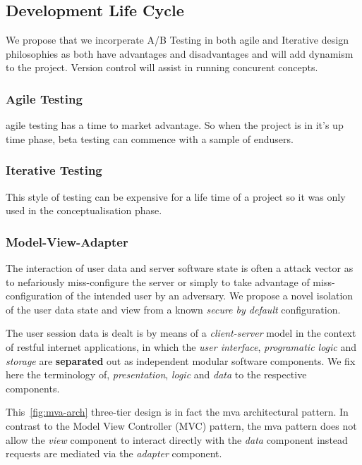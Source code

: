 \documentclass[letterpaper,12pt]{article}
\begin{document}
\subsection{Development Life Cycle}

We propose that we incorperate A/B Testing in both \Gls{agile} and Iterative design philosophies as both have advantages and disadvantages and will add dynamism to the project. Version control will assist in running concurent concepts. 

\subsubsection{Agile Testing}

\Gls{agile} testing has a time to market advantage. So when the project is in it's up time phase, beta testing can commence with a sample of endusers.

\subsubsection{Iterative Testing}

This style of testing can be expensive for a life time of a project so it was only used in the conceptualisation phase.

\subsubsection{Model-View-Adapter}

The interaction of user data and server software state is often a attack vector
as to nefariously miss-configure the server or simply to take advantage of
miss-configuration of the intended user by an adversary. We propose a novel
isolation of the user data state and view from a known \emph{secure by default}
configuration.

The user session data is dealt is by means of a \emph{client-server}
model in the context of \gls{restful} internet applications, in which
the \emph{user interface}, \emph{programatic logic}
and \emph{storage} are \textbf{separated} out as
independent modular software components. We fix here the terminology of,
\emph{presentation}, \emph{logic} and \emph{data} to the respective
components.



This~\cref{fig:mva-arch} three-tier design is in fact the \acrfull{mva} architectural pattern. In contrast to the Model View Controller (MVC)
pattern, the \acrshort{mva} pattern does not allow the \emph{view} component to interact
directly with the \emph{data} component instead requests are mediated via the
\emph{adapter} component.
\end{document}
